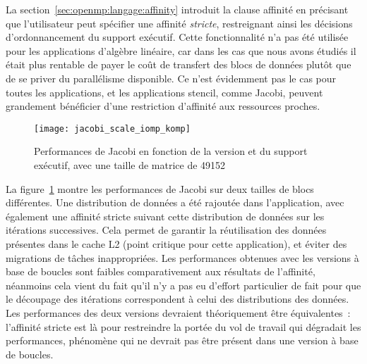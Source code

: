 La section~\ref{sec:openmp:langage:affinity} introduit la clause affinité en précisant que l'utilisateur peut spécifier une affinité \emph{stricte}, restreignant ainsi les décisions d'ordonnancement du support exécutif.
Cette fonctionnalité n'a pas été utilisée pour les applications d'algèbre linéaire, car dans les cas que nous avons étudiés il était plus rentable de payer le coût de transfert des blocs de données plutôt que de se priver du parallélisme disponible.
Ce n'est évidemment pas le cas pour toutes les applications, et les applications stencil, comme Jacobi, peuvent grandement bénéficier d'une restriction d'affinité aux ressources proches.

\begin{figure}[ht]
  \centering
  \texttt{[image: jacobi\_scale\_iomp\_komp]}
  \caption{Performances de Jacobi en fonction de la version et du support exécutif, avec une taille de matrice de 49152}\label{fig:contribs:perf_eval:eval-jacobi}
\end{figure}

La figure~\ref{fig:contribs:perf_eval:eval-jacobi} montre les performances de Jacobi sur deux tailles de blocs différentes.
Une distribution de données a été rajoutée dans l'application, avec également une affinité stricte suivant cette distribution de données sur les itérations successives.
Cela permet de garantir la réutilisation des données présentes dans le cache L2 (point critique pour cette application), et éviter des migrations de tâches inappropriées.
Les performances obtenues avec les versions à base de boucles sont faibles comparativement aux résultats de l'affinité, néanmoins cela vient du fait qu'il n'y a pas eu d'effort particulier de fait pour que le découpage des itérations correspondent à celui des distributions des données.
Les performances des deux versions devraient théoriquement être équivalentes~: l'affinité stricte est là pour restreindre la portée du vol de travail qui dégradait les performances, phénomène qui ne devrait pas être présent dans une version à base de boucles.
